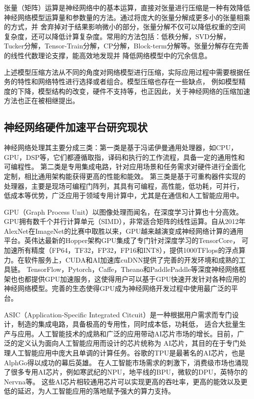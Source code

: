 张量（矩阵）运算是神经网络中的基本运算，直接对张量进行压缩是一种有效降低神经网络模型运算量和参数量的方法。通过将庞大的张量分解成更多小的张量相乘的方式，并
舍弃掉对于结果影响微小的部分，张量分解不仅可以降低权重的空间复杂度，还可以降低计算复杂度。常用的方法包括：低秩分解，SVD分解，
Tucker分解，Tensor-Train分解，CP分解，Block-term分解等。张量分解存在完善的线性代数理论支撑，能高效地发现并
降低网络模型中的冗余信息。

上述模型压缩方法从不同的角度对网络模型进行压缩，实际应用过程中需要根据任务的特性和网络特性进行选择或者组合。模型压缩也存在一些缺点，
例如模型精度的下降，模型结构的改变，硬件不支持等，也正因此，关于神经网络的压缩加速方法也正在被相继提出。

\subsection{神经网络硬件加速平台研究现状}
神经网络处理其主要分成三类：第一类是基于冯诺伊曼通用处理器，如CPU，GPU，DSP等，它们都遵循取指，译码和执行的工作流程，具备一定的通用性和可编程性。
第二类是专用集成电路，针对应用场景和任务需求对硬件进行全面化定制，相比通用架构能获得更高的性能和能效。
第三类是基于可重构器件实现的处理器，主要是现场可编程门阵列，其具有可编程，高性能，低功耗，可并行，
低成本等优势，广泛应用于领域专用计算中，尤其是在通信和人工智能应用中。

GPU（Graph Process Unit）以图像处理而闻名，在深度学习计算也十分高效。GPU拥有数千个并行计算单元（SIMD），非常适合矩阵的线性运算。自从2012年
AlexNet在ImageNet的比赛中取胜以来，GPU越来越演变成神经网络计算的通用平台。英伟达最新的Hopper架构GPU集成了专门针对深度学习的TensorCore，
可加速所有精度（FP64，TF32，FP32，FP16和INT8），提供1000TFlops的浮点算力。在软件服务上，CUDA和AI加速库cuDNN提供了完善的开发环境和成熟的工具链。
TensorFlow，Pytorch，Caffe，Theano和PaddlePaddle等深度神经网络框架也也都提供GPU加速服务，这使得用户可以基于GPU快速开发针对各种应用的
神经网络模型。完善的生态使得GPU成为神经网络开发过程中使用最广泛的平台。

ASIC（Application-Specific Integrated Citcuit）是一种根据用户需求而专门设计，制造的集成电路，具备极高的专用性，同时成本低，功耗低，
适合大批量生产与应用。人工智能技术的成熟和广泛的应用带动AI芯片市场的增长。目前，广泛的定义认为面向人工智能应用而设计的芯片统称为
AI芯片，其目的在于专门处理人工智能应用中庞大且单调的计算任务。谷歌的TPU是最著名的AI芯片，也是AlphGo得以成功的幕后英雄。
在人工智能市场需求的刺激下，消费级市场也涌现了很多专用AI芯片，例如寒武纪的NPU，地平线的BPU，微软的DPU，英特尔的Nervna等。
这些AI芯片相较通用芯片可以实现更高的吞吐率，更高的能效以及更低的延迟，为人工智能应用的落地赋予强大的算力支持。


